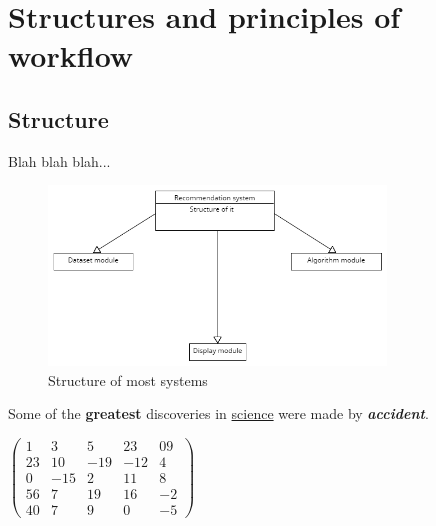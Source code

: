 \documentclass[10pt,twoside,english,a4paper]{article}
\begin{document}
\section{Structures and principles of workflow}

\subsection{Structure}
Blah blah blah...

\begin{figure}[h]
\centering
\includegraphics[width=0.8\textwidth]{system_structure}
\caption{Structure of most systems}
\label{fig:Types}
\end{figure}





Some of the \textbf{greatest}
discoveries in \underline{science} 
were made by \textbf{\textit{accident}}.

$\begin{pmatrix}
1&3&5&23&09\\
23&10&-19&-12&4\\
0&-15&2&11&8\\
56&7&19&16&-2\\
40&7&9&0&-5
\end{pmatrix}$


\end{document}
